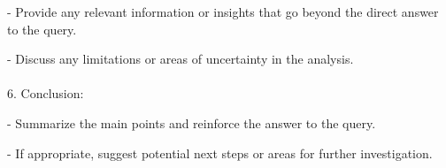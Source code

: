 \begin{textcolorbox}
\quad - Provide any relevant information or insights that go beyond the direct answer to the query.

\quad - Discuss any limitations or areas of uncertainty in the analysis.
\\\\
6. Conclusion:

\quad - Summarize the main points and reinforce the answer to the query.

\quad - If appropriate, suggest potential next steps or areas for further investigation.
\end{textcolorbox}
